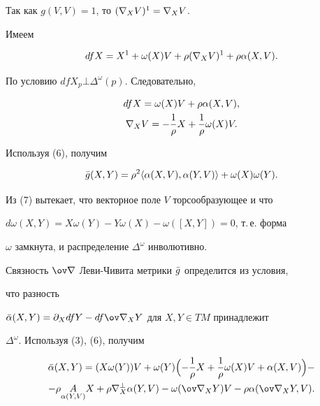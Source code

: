 Так как $g(V,V)=1$, то $(\nabla_XV)^1=\nabla_XV$. 


 


Имеем 


$$ 


dfX=X^1+\omega(X)V+\rho(\na_XV)^1+\rho\alpha(X,V). 


$$ 


По условию $dfX_p\bot\Delta^\omega(p)$. Следовательно, 


\begin{gather} 


dfX=\omega(X)V+\rho\alpha(X,V),\\ 


\na_XV=-\frac{1}{\rho}X+\frac{1}{\rho}\omega(X)V. 


\end{gather} 


Используя (6), получим 


\begin{equation} 


\Bar g(X,Y)=\rho^2\la\alpha(X,V),\alpha(Y,V)\ra+ 


\omega(X)\omega(Y). 


\end{equation} 


Из (7) вытекает, что векторное поле $V$ торсообразующее \cite{Sho} и что 


$d\omega(X,Y)=X\omega(Y)-Y\omega(X)-\omega([X,Y])=0$, т.\,е. форма 


$\omega$ замкнута, и распределение $\Delta^\omega$ инволютивно. 


 


Связность $\ov\na$ Леви-Чивита метрики $\Bar g$ определится из условия, 


что разность 


$\Bar \alpha(X,Y)=\partial_XdfY-df\ov\na_XY$ для $X,Y\in TM$ принадлежит 


$\Delta^\omega$. Используя (3), (6), получим 


\begin{gather*} 


\Bar\alpha(X,Y)=(X\omega(Y))V+\omega(Y)\Bigl(-\frac{1}{\rho}X 


+\frac{1}{\rho}\omega(X)V+\alpha(X,V)\Bigr)-\\ 


-\rho\underset{\alpha(Y,V)}{A}{}X+\rho\na^\bot_X\alpha(Y,V)- 


\omega(\ov\na_XY)V-\rho\alpha(\ov\na_XY,V). 


\end{gather*} 


